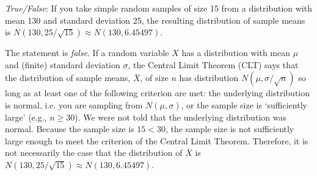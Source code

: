 \documentclass[11pt,letterpaper]{article}
\begin{document}
\quizsol \textit{True/False}: If you take simple random samples of size 15 from a distribution with mean 130 and standard deviation 25, the resulting distribution of sample means is $N(130, 25/\sqrt{15}) \approx N(130, 6.45497)$. \pspace

\sol The statement is \textit{false}. If a random variable $X$ has a distribution with mean $\mu$ and (finite) standard deviation $\sigma$, the Central Limit Theorem (CLT) says that the distribution of sample means, $\overline{X}$, of size $n$ has distribution $N(\mu, \sigma/\sqrt{n})$ so long as at least one of the following criterion are met: the underlying distribution is normal, i.e. you are sampling from $N(\mu, \sigma)$, or the sample size is `sufficiently large' (e.g., $n \geq 30$). We were not told that the underlying distribution was normal. Because the sample size is $15 < 30$, the sample size is not sufficiently large enough to meet the criterion of the Central Limit Theorem. Therefore, it is not necessarily the case that the distribution of $\overline{X}$ is $N(130, 25/\sqrt{15}) \approx N(130, 6.45497)$. \pvspace{1.5cm}
\end{document}
